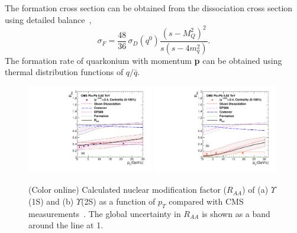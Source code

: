 { The formation cross section can be obtained from the dissociation cross section using
detailed balance~\cite{Thews:2000rj,Thews:2005vj},
  \begin{equation}
    \sigma_{F} = \frac{48}{36}\,\sigma_{D}(q^0)\frac{(s-M_{Q}^2)^{2}}{s(s-4m_q^{2})}.
  \end{equation}
  The formation rate of quarkonium with momentum {\bf p} can be obtained using
  thermal distribution functions of  $q/\bar{q}$.
  
  

\begin{figure}
\includegraphics[width=0.49\textwidth]{Figures/Fig20l_Y1S_CMS_RAAPt_Shade.pdf}
\includegraphics[width=0.49\textwidth]{Figures/Fig20r_Y2S_CMS_RAAPt_Shade.pdf}
\caption{(Color online) Calculated nuclear modification factor ($R_{AA}$) \cite{Kumar:2019xdj}
  of (a) $\Upsilon$(1S) and 
  (b) $\Upsilon$(2S) as a function of $p_{T}$ 
  compared with CMS measurements~\cite{CMS:2018zza}.
The global uncertainty in $R_{AA}$ is shown as a band around the line at 1.
}
\label{fig:UpsilonRaaPtCMS}
\end{figure}



}
